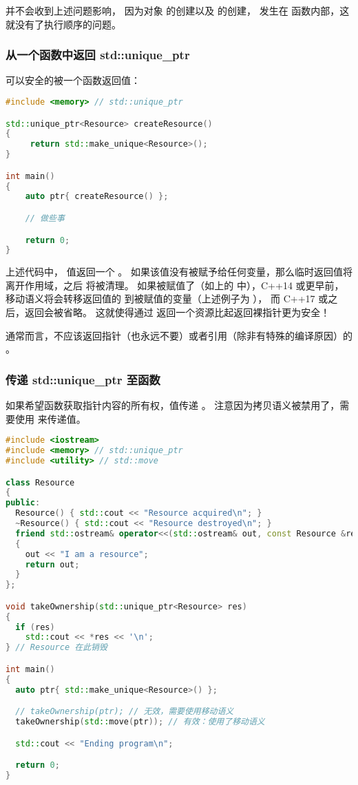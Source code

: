 \documentclass[../../LearnCpp.tex]{subfiles}
\begin{document}
 并不会收到上述问题影响，
因为对象  的创建以及  的创建，
发生在  函数内部，这就没有了执行顺序的问题。

\subsubsection*{从一个函数中返回 std::unique\_ptr}

 可以安全的被一个函数返回值：

\begin{lstlisting}[language=C++]
#include <memory> // std::unique_ptr

std::unique_ptr<Resource> createResource()
{
     return std::make_unique<Resource>();
}

int main()
{
    auto ptr{ createResource() };

    // 做些事

    return 0;
}
\end{lstlisting}

上述代码中， 值返回一个 。
如果该值没有被赋予给任何变量，那么临时返回值将离开作用域，之后  将被清理。
如果被赋值了（如上的  中），C++14 或更早前，
移动语义将会转移返回值的  到被赋值的变量（上述例子为 ），
而 C++17 或之后，返回会被省略。
这就使得通过  返回一个资源比起返回裸指针更为安全！

通常而言，不应该返回指针（也永远不要）或者引用（除非有特殊的编译原因）的  。

\subsubsection*{传递 std::unique\_ptr 至函数}

如果希望函数获取指针内容的所有权，值传递 。
注意因为拷贝语义被禁用了，需要使用  来传递值。

\begin{lstlisting}[language=C++]
#include <iostream>
#include <memory> // std::unique_ptr
#include <utility> // std::move

class Resource
{
public:
  Resource() { std::cout << "Resource acquired\n"; }
  ~Resource() { std::cout << "Resource destroyed\n"; }
  friend std::ostream& operator<<(std::ostream& out, const Resource &res)
  {
    out << "I am a resource";
    return out;
  }
};

void takeOwnership(std::unique_ptr<Resource> res)
{
  if (res)
    std::cout << *res << '\n';
} // Resource 在此销毁

int main()
{
  auto ptr{ std::make_unique<Resource>() };

  // takeOwnership(ptr); // 无效，需要使用移动语义
  takeOwnership(std::move(ptr)); // 有效：使用了移动语义

  std::cout << "Ending program\n";

  return 0;
}
\end{lstlisting}
\end{document}
